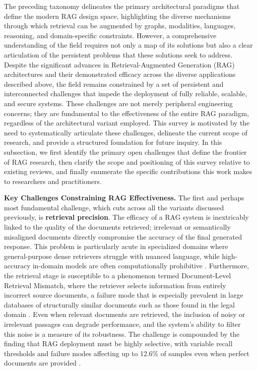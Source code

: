 \documentclass[11pt]{article}
\begin{document}
The preceding taxonomy delineates the primary architectural paradigms that define the modern RAG design space, highlighting the diverse mechanisms through which retrieval can be augmented by graphs, modalities, languages, reasoning, and domain-specific constraints. However, a comprehensive understanding of the field requires not only a map of its solutions but also a clear articulation of the persistent problems that these solutions seek to address. Despite the significant advances in Retrieval-Augmented Generation (RAG) architectures and their demonstrated efficacy across the diverse applications described above, the field remains constrained by a set of persistent and interconnected challenges that impede the deployment of fully reliable, scalable, and secure systems. These challenges are not merely peripheral engineering concerns; they are fundamental to the effectiveness of the entire RAG paradigm, regardless of the architectural variant employed. This survey is motivated by the need to systematically articulate these challenges, delineate the current scope of research, and provide a structured foundation for future inquiry. In this subsection, we first identify the primary open challenges that define the frontier of RAG research, then clarify the scope and positioning of this survey relative to existing reviews, and finally enumerate the specific contributions this work makes to researchers and practitioners.

\textbf{Key Challenges Constraining RAG Effectiveness.} The first and perhaps most fundamental challenge, which cuts across all the variants discussed previously, is \textbf{retrieval precision}. The efficacy of a RAG system is inextricably linked to the quality of the documents retrieved; irrelevant or semantically misaligned documents directly compromise the accuracy of the final generated response. This problem is particularly acute in specialized domains where general-purpose dense retrievers struggle with nuanced language, while high-accuracy in-domain models are often computationally prohibitive \cite{ref60}. Furthermore, the retrieval stage is susceptible to a phenomenon termed Document-Level Retrieval Mismatch, where the retriever selects information from entirely incorrect source documents, a failure mode that is especially prevalent in large databases of structurally similar documents such as those found in the legal domain \cite{ref61}. Even when relevant documents are retrieved, the inclusion of noisy or irrelevant passages can degrade performance, and the system's ability to filter this noise is a measure of its robustness. The challenge is compounded by the finding that RAG deployment must be highly selective, with variable recall thresholds and failure modes affecting up to 12.6\% of samples even when perfect documents are provided \cite{ref62}.
\end{document}
